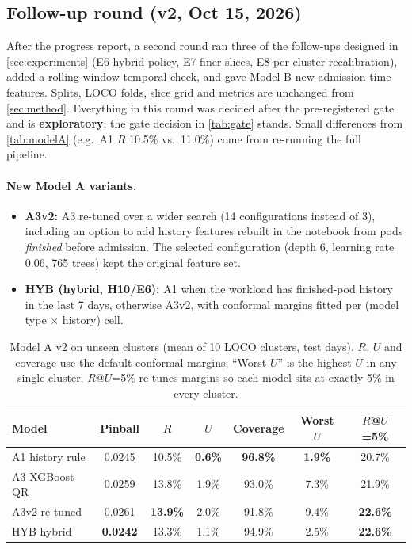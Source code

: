 \subsection{Follow-up round (v2, Oct 15, 2026)}
\label{sec:followup}

After the progress report, a second round ran three of the follow-ups designed in \cref{sec:experiments} (E6 hybrid policy, E7 finer slices, E8 per-cluster recalibration), added a rolling-window temporal check, and gave Model B new admission-time features. Splits, LOCO folds, slice grid and metrics are unchanged from \cref{sec:method}. Everything in this round was decided after the pre-registered gate and is \textbf{exploratory}; the gate decision in \cref{tab:gate} stands. Small differences from \cref{tab:modelA} (e.g.\ A1 $R$ 10.5\% vs.\ 11.0\%) come from re-running the full pipeline.

\paragraph{New Model A variants.}
\begin{itemize}
  \item \textbf{A3v2:} A3 re-tuned over a wider search (14 configurations instead of 3), including an option to add history features rebuilt in the notebook from pods \emph{finished} before admission. The selected configuration (depth 6, learning rate 0.06, 765 trees) kept the original feature set.
  \item \textbf{HYB (hybrid, H10/E6):} A1 when the workload has finished-pod history in the last 7 days, otherwise A3v2, with conformal margins fitted per (model type $\times$ history) cell.
\end{itemize}

\begin{table}[h]
\centering\small
\caption{Model A v2 on unseen clusters (mean of 10 LOCO clusters, test days). $R$, $U$ and coverage use the default conformal margins; ``Worst $U$'' is the highest $U$ in any single cluster; $R$@$U$=5\% re-tunes margins so each model sits at exactly 5\% in every cluster.}
\label{tab:v2A}
\begin{tabular}{@{}lcccccc@{}}
\toprule
Model & Pinball & $R$ & $U$ & Coverage & Worst $U$ & $R$@$U$=5\% \\
\midrule
A1 history rule & 0.0245 & 10.5\% & \textbf{0.6\%} & \textbf{96.8\%} & \textbf{1.9\%} & 20.7\% \\
A3 XGBoost QR   & 0.0259 & 13.8\% & 1.9\% & 93.0\% & 7.3\% & 21.9\% \\
A3v2 re-tuned   & 0.0261 & \textbf{13.9\%} & 2.0\% & 91.8\% & 9.4\% & \textbf{22.6\%} \\
HYB hybrid      & \textbf{0.0242} & 13.3\% & 1.1\% & 94.9\% & 2.5\% & \textbf{22.6\%} \\
\bottomrule
\end{tabular}
\end{table}

